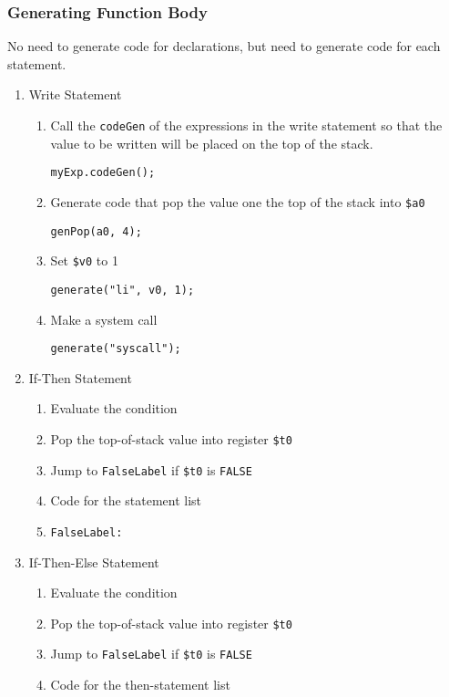 \documentclass[11pt]{article}
\begin{document}
\subsubsection{Generating Function Body}
\label{sec:org66a8804}
No need to generate code for declarations, but need to generate code for each statement.
\begin{enumerate}
\item Write Statement
\label{sec:org67bb5d5}
\begin{enumerate}
\item Call the \texttt{codeGen} of the expressions in the write statement so that the value to be written
will be placed on the top of the stack.
\begin{verbatim}
myExp.codeGen();
\end{verbatim}
\item Generate code that pop the value one the top of the stack into \texttt{\$a0}
\begin{verbatim}
genPop(a0, 4);
\end{verbatim}
\item Set \texttt{\$v0} to 1
\begin{verbatim}
generate("li", v0, 1);
\end{verbatim}
\item Make a system call
\begin{verbatim}
generate("syscall");
\end{verbatim}
\end{enumerate}
\item If-Then Statement
\label{sec:org0eb7850}
\begin{enumerate}
\item Evaluate the condition
\item Pop the top-of-stack value into register \texttt{\$t0}
\item Jump to \texttt{FalseLabel} if \texttt{\$t0} is \texttt{FALSE}
\item Code for the statement list
\item \texttt{FalseLabel:}
\end{enumerate}
\item If-Then-Else Statement
\label{sec:org8ebfcd1}
\begin{enumerate}
\item Evaluate the condition
\item Pop the top-of-stack value into register \texttt{\$t0}
\item Jump to \texttt{FalseLabel} if \texttt{\$t0} is \texttt{FALSE}
\item Code for the then-statement list

\end{enumerate}
\end{enumerate}
\end{document}
